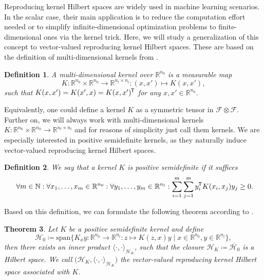 \documentclass[11pt, a4paper]{article}
\newtheorem{theorem}{Theorem}[section]
\newtheorem{definition}[theorem]{Definition}
\newcommand{\N}{\mathbb{N}}
\newcommand{\R}{\mathbb{R}}
\newcommand{\F}{\mathcal{F}}
\renewcommand{\H}{\mathcal{H}}
\newcommand*{\tr}{^{\mkern-1.5mu\mathsf{T}}}
\begin{document}
Reproducing kernel Hilbert spaces are widely used in machine learning scenarios. In the scalar case, their main application is to reduce the computation effort needed or to simplify infinite-dimensional optimization problems to finite-dimensional ones via the kernel trick. Here, we will study a generalization of this concept to vector-valued reproducing kernel Hilbert spaces. These are based on the definition of multi-dimensional kernels from \cite{NTK}.

\begin{definition}
A multi-dimensional kernel over $\R^{n_0}$ is a measurable map
\[ K: \R^{n_0} \times \R^{n_0} \to \R^{n_l \times n_l} : (x,x') \mapsto K(x,x'), \]
such that $K(x,x') = K(x',x) = K(x,x')\tr$ for any $x,x' \in \R^{n_0}$.
\end{definition}

Equivalently, one could define a kernel $K$ as a symmetric tensor in $\F \otimes \F$. Further on, we will always work with multi-dimensional kernels $K: \R^{n_0} \times \R^{n_0} \to \R^{n_l \times n_l}$ and for reasons of simplicity just call them kernels. We are especially interested in positive semidefinite kernels, as they naturally induce vector-valued reproducing kernel Hilbert spaces.

\begin{definition}
We say that a kernel $K$ is positive semidefinite if it suffices
\[ \forall m \in \N : \forall x_1, \dots, x_m \in \R^{n_0} : \forall y_1, \dots, y_m \in \R^{n_l}: \sum_{i=1}^{m} \sum_{j=1}^{m} y_i \tr K(x_i, x_j) y_j \geq 0. \]
\end{definition}

Based on this definition, we can formulate the following theorem according to \cite{RKHS}.

\begin{theorem} \label{thm:rkhs}
Let $K$ be a positive semidefinite kernel and define
\[ \H_0 \coloneq \text{span} \Big \{ K_xy : \R^{n_0} \to \R^{n_l} : z \mapsto K(z,x)y \mid x \in \R^{n_0}, y \in \R^{n_l} \Big \}, \]
then there exists an inner product $\langle \cdot, \cdot \rangle_{\H_K}$, such that the closure $\H_K \coloneq \overline{\H_0}$ is a Hilbert space.
We call $\big (\H_K, \langle \cdot, \cdot \rangle_{\H_K} \big )$ the vector-valued reproducing kernel Hilbert space associated with $K$.
\end{theorem}
\end{document}
